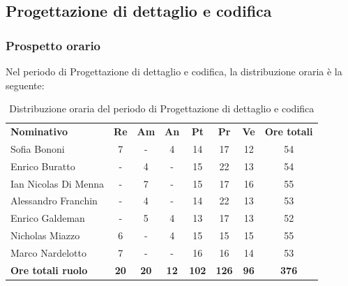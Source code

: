 \documentclass[../piano-di-progetto.tex]{subfiles}
\begin{document}
  \subsection{Progettazione di dettaglio e codifica}

  \subsubsection{Prospetto orario}
  Nel periodo di Progettazione di dettaglio e codifica, la distribuzione oraria è la seguente:
  \begin{table}[H]
    \centering
    \begin{tabular}{lccccccc}
      \rowcolor{lightgray}
      \textbf{Nominativo}        & \textbf{Re} & \textbf{Am}  & \textbf{An} & \textbf{Pt}  & \textbf{Pr}   & \textbf{Ve} & \textbf{Ore totali} \\
      Sofia Bononi              & 7           & -           & 4           & 14           & 17           & 12          & 54           \\
      Enrico Buratto            & -           & 4           & -           & 15           & 22           & 13          & 54           \\
      Ian Nicolas Di Menna      & -           & 7           & -           & 15           & 17           & 16          & 55           \\
      Alessandro Franchin       & -           & 4           & -           & 14           & 22           & 13          & 53           \\
      Enrico Galdeman           & -           & 5           & 4           & 13           & 17           & 13          & 52           \\
      Nicholas Miazzo           & 6           & -           & 4           & 15           & 15           & 15          & 55           \\
      Marco Nardelotto          & 7           & -           & -           & 16           & 16           & 14          & 53           \\
      \textbf{Ore totali ruolo} & \textbf{20} & \textbf{20} & \textbf{12} & \textbf{102} & \textbf{126} & \textbf{96} & \textbf{376}  
    \end{tabular}
    \caption{Distribuzione oraria del periodo di Progettazione di dettaglio e codifica}
  \end{table}
\end{document}
